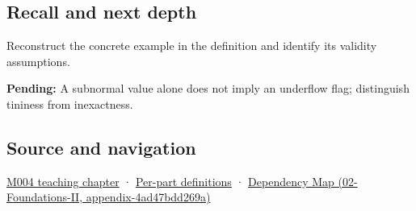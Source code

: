 \subsection{Recall and next depth}\label{recall-and-next-depth}

Reconstruct the concrete example in the definition and identify its validity assumptions.

\textbf{Pending:} A subnormal value alone does not imply an underflow flag; distinguish tininess from inexactness.

\subsection{Source and navigation}\label{source-and-navigation}

\href{Continuous\%20Notes/Computing\%20Foundations\%20-\%20From\%20Bits\%20to\%20C++\%20and\%20Systems\%20APIs\#A\%20stretching\%20ruler\%20for\%20real-valued\%20quantities}{M004 teaching chapter} · \hyperref[appendix-fd090d982a15]{Per-part definitions} · \href{}{Dependency Map (02-Foundations-II, appendix-4ad47bdd269a)}
